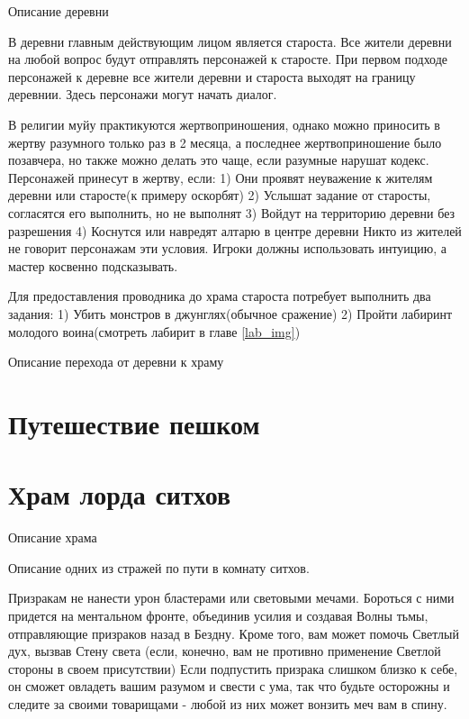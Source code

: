 \documentclass{article}
\begin{document}
Описание деревни
\begin{myquote}
\color{sw}

\end{myquote}
В деревни главным действующим лицом является староста. Все жители деревни на любой вопрос будут отправлять персонажей к старосте. При первом подходе персонажей к деревне все жители деревни и староста выходят на границу деревнии. Здесь персонажи могут начать диалог.

В религии муйу практикуются жертвоприношения, однако можно приносить в жертву разумного только раз в 2 месяца, а последнее жертвоприношение было позавчера, но также можно делать это чаще, если разумные нарушат кодекс.
Персонажей принесут в жертву, если:
1) Они проявят неуважение к жителям деревни или старосте(к примеру оскорбят)
2) Услышат задание от старосты, согласятся его выполнить, но не выполнят
3) Войдут на территорию деревни без разрешения
4) Коснутся или навредят алтарю в центре деревни
Никто из жителей не говорит персонажам эти условия. Игроки должны использовать интуицию, а мастер косвенно подсказывать.

Для предоставления проводника до храма староста потребует выполнить два задания:
1) Убить монстров в джунглях(обычное сражение)
2) Пройти лабиринт молодого воина(смотреть лабирит в главе \ref{lab_img})


Описание перехода от деревни к храму
\begin{myquote}
\color{sw}

\end{myquote}

\section{Путешествие пешком}


\section{Храм лорда ситхов}
Описание храма
\begin{myquote}
\color{sw}

\end{myquote}

Описание одних из стражей по пути в комнату ситхов.
\begin{myquote}
\color{sw}

\end{myquote}
Призракам не нанести урон бластерами или световыми мечами.
Бороться с ними придется на ментальном фронте, объединив усилия и создавая Волны тьмы, отправляющие призраков назад в Бездну.
Кроме того, вам может помочь Светлый дух, вызвав Стену света (если, конечно, вам не противно применение Светлой стороны в своем присутствии)
Если подпустить призрака слишком близко к себе, он сможет овладеть вашим разумом и свести с ума, так что будьте осторожны и следите за своими товарищами - любой из них может вонзить меч вам в спину.
\end{document}
